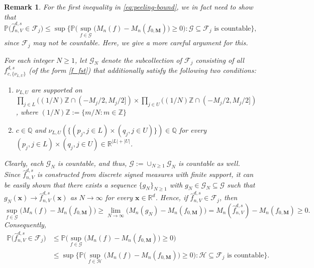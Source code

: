 \documentclass[10pt]{article}
\newtheorem{remark}{Remark}
\newcommand{\F}{{\mathcal{F}}}
\newcommand{\G}{{\mathcal{G}}}
\newcommand{\R}{{\mathbb R}}
\renewcommand{\P}{{\mathbb P}}
\newcommand{\lsefstinf}{{\hat{f}^{d, s}_{n, V}}}
\newcommand{\fcnu}{{f^{d, s}_{c, \{\nu_{L, U}\}}}}
\newcommand{\xbf}{{\mathbf{x}}}
\newcommand{\Mbf}{{\mathbf{M}}}
\begin{document}
\begin{remark}
    For the first inequality in \eqref{eq:peeling-bound}, we in fact need to 
    show that
    \begin{equation*}
        \P\big(\lsefstinf \in \F_j\big) 
        \le \sup \Big\{\P\Big(\sup_{f \in \G} 
        \big(M_n(f) - M_n(f_{0, \Mbf})\big) \ge 0 \Big): 
        \G \subseteq \F_j \text{ is countable} \Big\},
    \end{equation*}
    since $\F_j$ may not be countable.
    Here, we give a more careful argument for this.
    
    For each integer $N \ge 1$, let $\G_N$ denote the subcollection of $\F_j$ 
    consisting of all $\fcnu$ (of the 
    form \eqref{f_fst}) that additionally satisfy the following two conditions:
    \begin{enumerate}[label = (\alph*)]
    \item $\nu_{L, U}$ are supported on 
    $\prod_{j \in L} ((1/N)\mathbb{Z} \cap (-M_j/2, M_j/2]) 
    \times \prod_{j \in U} ((1/N)\mathbb{Z} \cap (-M_j/2, M_j/2])$, where 
    $(1/N)\mathbb{Z} := \{m/N: m \in \mathbb{Z}\}$
    \item $c \in \mathbb{Q}$ and $\nu_{L, U}(\{(p_j, j \in L) 
    \times (q_j, j \in U)\}) \in \mathbb{Q}$ 
    for every $(p_j, j \in L) \times (q_j, j \in U) \in \R^{|L| + |U|}$.
    \end{enumerate}
    Clearly, each $\G_N$ is countable, and thus, $\G := \cup_{N \ge 1} \G_N$ is 
    countable as well. Since $\lsefstinf$ is constructed from discrete signed  
    measures with finite support, 
    it can be easily shown that there 
    exists a sequence $\{g_N\}_{N \ge 1}$ with $g_N \in \G_N \subseteq \G$ such 
    that $g_N(\xbf) \to \lsefstinf(\xbf)$ as $N \to \infty$ for every 
    $\xbf \in \R^d$. Hence, if $\lsefstinf \in \F_j$, then
    \begin{equation*}
        \sup_{f \in \G} \big(M_n(f) - M_n(f_{0, \Mbf})\big) 
        \ge \lim_{N \to \infty} \big(M_n(g_N) - M_n(f_{0, \Mbf})\big) 
        = M_n(\lsefstinf) - M_n(f_{0, \Mbf}) \ge 0.
    \end{equation*}
    Consequently,
    \begin{equation*}
    \begin{aligned}
        \P\big(\lsefstinf \in \F_j\big) 
        &\le \P\Big(\sup_{f \in \G} \big(M_n(f) - M_n(f_{0, \Mbf})\big) \ge 0\Big) \\
        &\le \sup \Big\{\P\Big(\sup_{f \in \mathcal{H}} \big(M_n(f) - M_n(f_{0, \Mbf})\big) \ge 0 \Big): 
        \mathcal{H} \subseteq \F_j \text{ is countable} \Big\}.
    \end{aligned}
    \end{equation*}
\end{remark}
\end{document}
